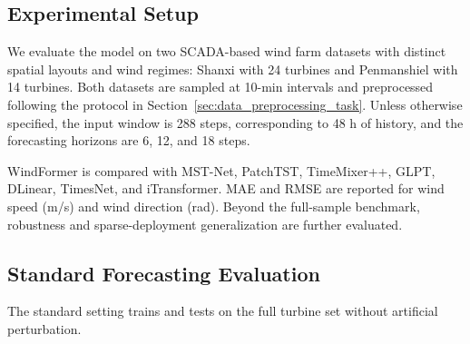 \subsection{Experimental Setup}
\label{subsec:experimental_setup}

We evaluate the model on two SCADA-based wind farm datasets with distinct spatial layouts and wind regimes: Shanxi with 24 turbines and Penmanshiel with 14 turbines. Both datasets are sampled at 10-min intervals and preprocessed following the protocol in Section~\ref{sec:data_preprocessing_task}. Unless otherwise specified, the input window is 288 steps, corresponding to 48 h of history, and the forecasting horizons are 6, 12, and 18 steps.



WindFormer is compared with MST-Net, PatchTST, TimeMixer++, GLPT, DLinear, TimesNet, and iTransformer. MAE and RMSE are reported for wind speed (m/s) and wind direction (rad). Beyond the full-sample benchmark, robustness and sparse-deployment generalization are further evaluated.

\subsection{Standard Forecasting Evaluation}
\label{subsec:standard_forecasting}

The standard setting trains and tests on the full turbine set without artificial perturbation.



